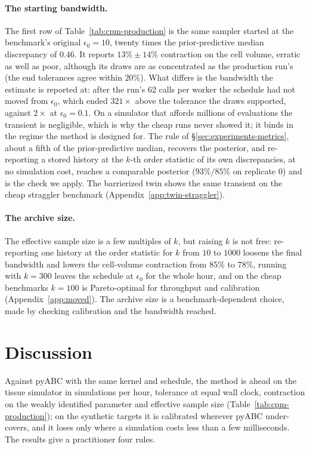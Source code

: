 \documentclass[10pt]{article}
\theoremstyle{plain}
\theoremstyle{definition}
\begin{document}
\paragraph{The starting bandwidth.} The first row of Table~\ref{tab:cpm-production} is the same sampler started at the benchmark's original $\epsilon_0=10$, twenty times the prior-predictive median discrepancy of $0.46$. It reports $13\%\pm14\%$ contraction on the cell volume, erratic as well as poor, although its draws are as concentrated as the production run's (the end tolerances agree within $20\%$). What differs is the bandwidth the estimate is reported at: after the run's $62$ calls per worker the schedule had not moved from $\epsilon_0$, which ended $321\times$ above the tolerance the draws supported, against $2\times$ at $\epsilon_0=0.1$. On a simulator that affords millions of evaluations the transient is negligible, which is why the cheap runs never showed it; it binds in the regime the method is designed for. The rule of \S\ref{sec:experiments-metrics}, about a fifth of the prior-predictive median, recovers the posterior, and re-reporting a stored history at the $k$-th order statistic of its own discrepancies, at no simulation cost, reaches a comparable posterior ($93\%/85\%$ on replicate $0$) and is the check we apply. The barrierized twin shows the same transient on the cheap straggler benchmark (Appendix~\ref{app:twin-straggler}).

\paragraph{The archive size.} The effective sample size is a few multiples of $k$, but raising $k$ is not free: re-reporting one history at the order statistic for $k$ from $10$ to $1000$ loosens the final bandwidth and lowers the cell-volume contraction from $85\%$ to $78\%$, running with $k=300$ leaves the schedule at $\epsilon_0$ for the whole hour, and on the cheap benchmarks $k=100$ is Pareto-optimal for throughput and calibration (Appendix~\ref{app:moved}). The archive size is a benchmark-dependent choice, made by checking calibration and the bandwidth reached.

\section{Discussion}\label{sec:discussion}
Against pyABC with the same kernel and schedule, the method is ahead on the tissue simulator in simulations per hour, tolerance at equal wall clock, contraction on the weakly identified parameter and effective sample size (Table~\ref{tab:cpm-production}); on the synthetic targets it is calibrated wherever pyABC under-covers, and it loses only where a simulation costs less than a few milliseconds. The results give a practitioner four rules.
\end{document}
